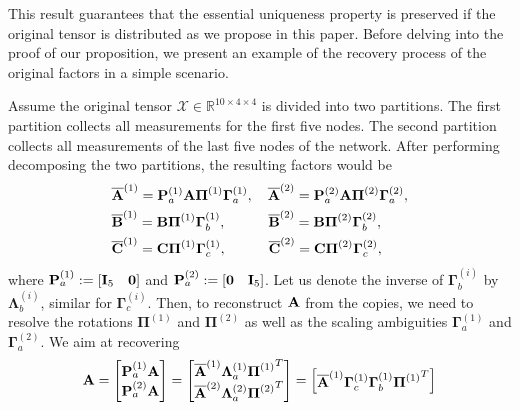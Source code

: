 \documentclass[journal]{IEEEtran}
\newcounter{propose}
\newcommand{\Ten}[1]{\mathcal{#1}}
\begin{document}
{This result guarantees that the essential uniqueness property is preserved if the original tensor is distributed as we propose in this paper. Before delving into the proof of our proposition, we present an example of the recovery process of the original factors in a simple scenario.

Assume the original tensor $\Ten{X}\in\mathbb{R}^{10\times 4\times 4}$ is divided into two partitions. The first partition collects all measurements for the first five nodes. The second partition collects all measurements of the last five nodes of the network. After performing decomposing the two partitions, the resulting factors would be
\begin{align}\label{eq:factors-a}
    &\overline{\bf A}^{(1)} = {\bf P}_a^{(1)} {\bf A} \boldsymbol{\Pi}^{(1)} \boldsymbol{\Gamma}_a^{(1)}, \quad 
    \overline{\bf A}^{(2)} = {\bf P}_a^{(2)} {\bf A} \boldsymbol{\Pi}^{(2)} \boldsymbol{\Gamma}_a^{(2)},\\\label{eq:factors-b}
    &\overline{\bf B}^{(1)} = {\bf B} \boldsymbol{\Pi}^{(1)} \boldsymbol{\Gamma}_b^{(1)}, \quad 
    \qquad\overline{\bf B}^{(2)} = {\bf B} \boldsymbol{\Pi}^{(2)} \boldsymbol{\Gamma}_b^{(2)}, \\\label{eq:factors-c}
    &\overline{\bf C}^{(1)} = {\bf C} \boldsymbol{\Pi}^{(1)} \boldsymbol{\Gamma}_c^{(1)}, \quad 
    \qquad\overline{\bf C}^{(2)} = {\bf C} \boldsymbol{\Pi}^{(2)} \boldsymbol{\Gamma}_c^{(2)},
\end{align}
where ${\bf P}_a^{(1)}:= [{\bf I}_5\quad {\bf 0}]$ and ${\bf P}_a^{(2)}:= [{\bf 0}\quad {\bf I}_5]$. Let us denote the inverse of $\boldsymbol{\Gamma}_{b}^{(i)}$ by $\boldsymbol{\Lambda}_b^{(i)}$, similar for $\boldsymbol{\Gamma}_c^{(i)}$. Then, to reconstruct ${\bf A}$ from the copies, we need to resolve the rotations $\boldsymbol{\Pi}^{(1)}$ and $\boldsymbol{\Pi}^{(2)}$ as well as the scaling ambiguities $\boldsymbol{\Gamma}_a^{(1)}$ and $\boldsymbol{\Gamma}_a^{(2)}$. We aim at recovering 
\begin{align}\notag
    {\bf A} = \begin{bmatrix} {\bf P}_a^{(1)} {\bf A}\\
    {\bf P}_a^{(2)} {\bf A}
    \end{bmatrix} = \begin{bmatrix} \overline{\bf A}^{(1)} \boldsymbol{\Lambda}_a^{(1)} {\boldsymbol{\Pi}^{(1)}}^T\\
    \overline{\bf A}^{(2)} \boldsymbol{\Lambda}_a^{(2)} {\boldsymbol{\Pi}^{(2)}}^T
    \end{bmatrix}= \begin{bmatrix} \overline{\bf A}^{(1)} \boldsymbol{\Gamma}_c^{(1)} \boldsymbol{\Gamma}_b^{(1)} {\boldsymbol{\Pi}^{(1)}}^T\\

\end{bmatrix}
\end{align}}
\end{document}
